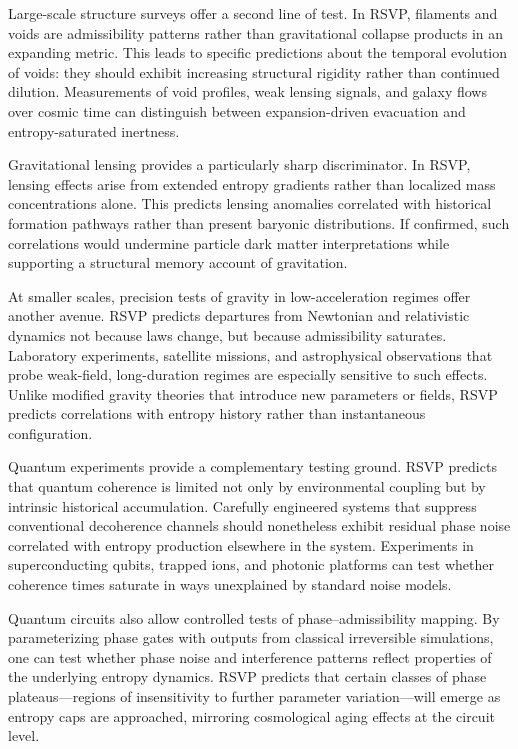 \documentclass[11pt,oneside]{book}
\begin{document}
Large-scale structure surveys offer a second line of test. In RSVP, filaments and voids are admissibility patterns rather than gravitational collapse products in an expanding metric. This leads to specific predictions about the temporal evolution of voids: they should exhibit increasing structural rigidity rather than continued dilution. Measurements of void profiles, weak lensing signals, and galaxy flows over cosmic time can distinguish between expansion-driven evacuation and entropy-saturated inertness.

Gravitational lensing provides a particularly sharp discriminator. In RSVP, lensing effects arise from extended entropy gradients rather than localized mass concentrations alone. This predicts lensing anomalies correlated with historical formation pathways rather than present baryonic distributions. If confirmed, such correlations would undermine particle dark matter interpretations while supporting a structural memory account of gravitation.

At smaller scales, precision tests of gravity in low-acceleration regimes offer another avenue. RSVP predicts departures from Newtonian and relativistic dynamics not because laws change, but because admissibility saturates. Laboratory experiments, satellite missions, and astrophysical observations that probe weak-field, long-duration regimes are especially sensitive to such effects. Unlike modified gravity theories that introduce new parameters or fields, RSVP predicts correlations with entropy history rather than instantaneous configuration.

Quantum experiments provide a complementary testing ground. RSVP predicts that quantum coherence is limited not only by environmental coupling but by intrinsic historical accumulation. Carefully engineered systems that suppress conventional decoherence channels should nonetheless exhibit residual phase noise correlated with entropy production elsewhere in the system. Experiments in superconducting qubits, trapped ions, and photonic platforms can test whether coherence times saturate in ways unexplained by standard noise models.

Quantum circuits also allow controlled tests of phase–admissibility mapping. By parameterizing phase gates with outputs from classical irreversible simulations, one can test whether phase noise and interference patterns reflect properties of the underlying entropy dynamics. RSVP predicts that certain classes of phase plateaus—regions of insensitivity to further parameter variation—will emerge as entropy caps are approached, mirroring cosmological aging effects at the circuit level.
\end{document}
